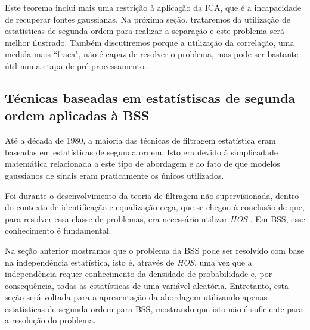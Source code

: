     Este teorema inclui mais uma restrição à aplicação da ICA, que é a incapacidade de recuperar fontes gaussianas. Na próxima seção, trataremos da utilização de estatísticas de segunda ordem para realizar a separação e este problema será melhor ilustrado. Também discutiremos porque a utilização da correlação, uma medida mais ``fraca", não é capaz de resolver o problema, mas pode ser bastante útil numa etapa de pré-processamento.
  
\subsection{Técnicas baseadas em estatístiscas de segunda ordem aplicadas à BSS}\label{secondorder}

    Até a década de 1980, a maioria das técnicas de filtragem estatística eram baseadas em estatísticas de segunda ordem. Isto era devido à simplicadade matemática relacionada a este tipo de abordagem e ao fato de que modelos gaussianos de sinais eram praticamente os únicos utilizados. 
    
    Foi durante o desenvolvimento da teoria de filtragem não-supervisionada, dentro do contexto de identificação e equalização cega, que se chegou à conclusão de que, para resolver essa classe de problemas, era necessário utilizar \textit{HOS} \cite{HOS}. Em BSS, esse conhecimento é fundamental.
    
    Na seção anterior mostramos que o problema da BSS pode ser resolvido com base na independência estatística, isto é, através de \textit{HOS}, uma vez que a independência requer conhecimento da densidade de probabilidade e, por consequência, todas as estatísticas de uma variável aleatória. Entretanto, esta seção será voltada para a apresentação da abordagem utilizando apenas estatísticas de segunda ordem para BSS, mostrando que isto não é suficiente para a resolução do problema.
    
